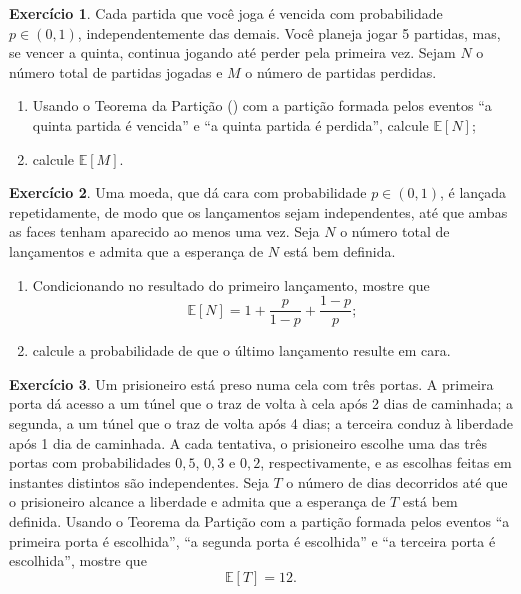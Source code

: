 \documentclass[12pt,portuguese]{article}
\theoremstyle{definition}
\newtheorem{exercise}{Exercício}
\begin{document}
\begin{exercise}\label{exercise:jogos-ate-perder}
Cada partida que você joga é vencida com probabilidade \(p \in (0,1)\),
independentemente das demais. Você planeja jogar 5 partidas, mas, se
vencer a quinta, continua jogando até perder pela primeira vez. Sejam
\(N\) o número total de partidas jogadas e \(M\) o número de partidas
perdidas.
\begin{enumerate}[label=(\alph*)]
  \item Usando o Teorema da Partição
        () com a partição formada pelos
        eventos ``a quinta partida é vencida'' e ``a quinta partida é
        perdida'', calcule \(\mathbb{E}[N]\);
  \item calcule \(\mathbb{E}[M]\).
\end{enumerate}
\end{exercise}


\begin{exercise}\label{exercise:duas-faces}
Uma moeda, que dá cara com probabilidade \(p \in (0,1)\), é lançada
repetidamente, de modo que os lançamentos sejam independentes, até que
ambas as faces tenham aparecido ao menos uma vez. Seja \(N\) o número
total de lançamentos e admita que a esperança de \(N\) está bem definida.
\begin{enumerate}[label=(\alph*)]
  \item Condicionando no resultado do primeiro lançamento, mostre que
        \[
        \mathbb{E}[N] = 1 + \frac{p}{1-p} + \frac{1-p}{p};
        \]
  \item calcule a probabilidade de que o último lançamento resulte em
        cara.
\end{enumerate}
\end{exercise}


\begin{exercise}\label{exercise:prisioneiro-tres-portas}
Um prisioneiro está preso numa cela com três portas. A primeira porta dá
acesso a um túnel que o traz de volta à cela após 2 dias de caminhada; a
segunda, a um túnel que o traz de volta após 4 dias; a terceira conduz à
liberdade após 1 dia de caminhada. A cada tentativa, o prisioneiro
escolhe uma das três portas com probabilidades \(0{,}5\), \(0{,}3\) e
\(0{,}2\), respectivamente, e as escolhas feitas em instantes distintos
são independentes. Seja \(T\) o número de dias decorridos até que o
prisioneiro alcance a liberdade e admita que a esperança de \(T\) está
bem definida. Usando o Teorema da Partição com a partição formada pelos
eventos ``a primeira porta é escolhida'', ``a segunda porta é escolhida''
e ``a terceira porta é escolhida'', mostre que
\[
\mathbb{E}[T] = 12.
\]
\end{exercise}
\end{document}
